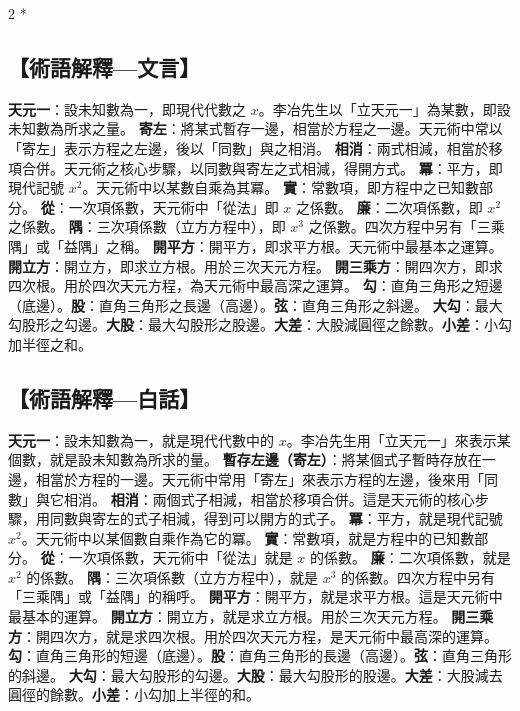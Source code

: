 \documentclass[11pt,a4paper]{article}
\begin{document}
\vspace{0.5cm}
\begin{paracol}{2}
\switchcolumn[0]*\subsection*{【術語解釋---文言】}
{\small
\textbf{天元一}：設未知數為一，即現代代數之 $x$。李冶先生以「立天元一」為某數，即設未知數為所求之量。
\textbf{寄左}：將某式暫存一邊，相當於方程之一邊。天元術中常以「寄左」表示方程之左邊，後以「同數」與之相消。
\textbf{相消}：兩式相減，相當於移項合併。天元術之核心步驟，以同數與寄左之式相減，得開方式。
\textbf{冪}：平方，即現代記號 $x^2$。天元術中以某數自乘為其冪。
\textbf{實}：常數項，即方程中之已知數部分。
\textbf{從}：一次項係數，天元術中「從法」即 $x$ 之係數。
\textbf{廉}：二次項係數，即 $x^2$ 之係數。
\textbf{隅}：三次項係數（立方方程中），即 $x^3$ 之係數。四次方程中另有「三乘隅」或「益隅」之稱。
\textbf{開平方}：開平方，即求平方根。天元術中最基本之運算。
\textbf{開立方}：開立方，即求立方根。用於三次天元方程。
\textbf{開三乘方}：開四次方，即求四次根。用於四次天元方程，為天元術中最高深之運算。
\textbf{勾}：直角三角形之短邊（底邊）。\textbf{股}：直角三角形之長邊（高邊）。\textbf{弦}：直角三角形之斜邊。
\textbf{大勾}：最大勾股形之勾邊。\textbf{大股}：最大勾股形之股邊。\textbf{大差}：大股減圓徑之餘數。\textbf{小差}：小勾加半徑之和。
}

\switchcolumn\subsection*{【術語解釋---白話】}
{\small
\textbf{天元一}：設未知數為一，就是現代代數中的 $x$。李冶先生用「立天元一」來表示某個數，就是設未知數為所求的量。
\textbf{暫存左邊（寄左）}：將某個式子暫時存放在一邊，相當於方程的一邊。天元術中常用「寄左」來表示方程的左邊，後來用「同數」與它相消。
\textbf{相消}：兩個式子相減，相當於移項合併。這是天元術的核心步驟，用同數與寄左的式子相減，得到可以開方的式子。
\textbf{冪}：平方，就是現代記號 $x^2$。天元術中以某個數自乘作為它的冪。
\textbf{實}：常數項，就是方程中的已知數部分。
\textbf{從}：一次項係數，天元術中「從法」就是 $x$ 的係數。
\textbf{廉}：二次項係數，就是 $x^2$ 的係數。
\textbf{隅}：三次項係數（立方方程中），就是 $x^3$ 的係數。四次方程中另有「三乘隅」或「益隅」的稱呼。
\textbf{開平方}：開平方，就是求平方根。這是天元術中最基本的運算。
\textbf{開立方}：開立方，就是求立方根。用於三次天元方程。
\textbf{開三乘方}：開四次方，就是求四次根。用於四次天元方程，是天元術中最高深的運算。
\textbf{勾}：直角三角形的短邊（底邊）。\textbf{股}：直角三角形的長邊（高邊）。\textbf{弦}：直角三角形的斜邊。
\textbf{大勾}：最大勾股形的勾邊。\textbf{大股}：最大勾股形的股邊。\textbf{大差}：大股減去圓徑的餘數。\textbf{小差}：小勾加上半徑的和。
}
\end{paracol}
\end{document}

